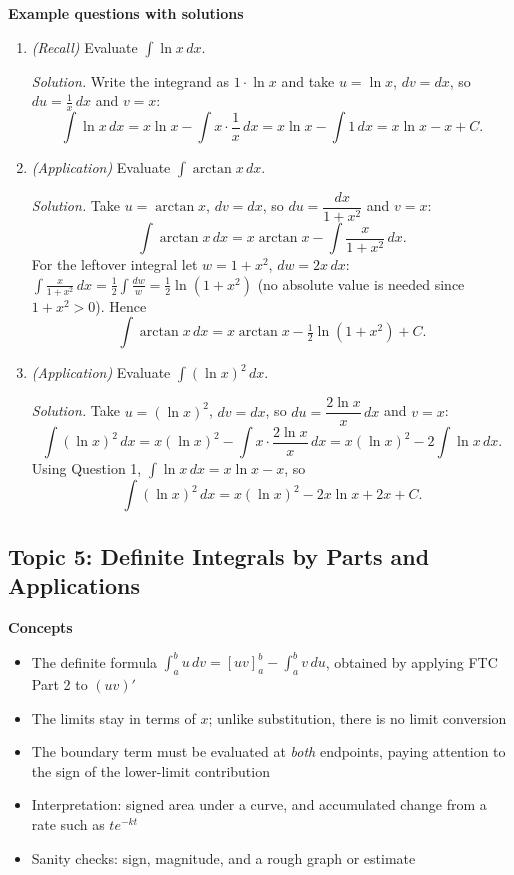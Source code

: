 \documentclass[11pt]{article}
\begin{document}
\textbf{Example questions with solutions}
\begin{enumerate}
\item \emph{(Recall)} Evaluate $\displaystyle\int\ln x\,dx$.

\textit{Solution.} Write the integrand as $1\cdot\ln x$ and take $u=\ln x$, $dv=dx$, so $du=\frac1x\,dx$ and $v=x$:
\[ \int\ln x\,dx = x\ln x - \int x\cdot\frac1x\,dx = x\ln x - \int 1\,dx = x\ln x - x + C. \]

\item \emph{(Application)} Evaluate $\displaystyle\int\arctan x\,dx$.

\textit{Solution.} Take $u=\arctan x$, $dv=dx$, so $du=\dfrac{dx}{1+x^2}$ and $v=x$:
\[ \int\arctan x\,dx = x\arctan x - \int\frac{x}{1+x^2}\,dx. \]
For the leftover integral let $w=1+x^2$, $dw=2x\,dx$: $\int\frac{x}{1+x^2}\,dx=\frac12\int\frac{dw}{w}=\frac12\ln(1+x^2)$ (no absolute value is needed since $1+x^2>0$). Hence
\[ \int\arctan x\,dx = x\arctan x - \tfrac12\ln(1+x^2) + C. \]

\item \emph{(Application)} Evaluate $\displaystyle\int(\ln x)^2\,dx$.

\textit{Solution.} Take $u=(\ln x)^2$, $dv=dx$, so $du=\dfrac{2\ln x}{x}\,dx$ and $v=x$:
\[ \int(\ln x)^2\,dx = x(\ln x)^2 - \int x\cdot\frac{2\ln x}{x}\,dx = x(\ln x)^2 - 2\int\ln x\,dx. \]
Using Question 1, $\int\ln x\,dx = x\ln x - x$, so
\[ \int(\ln x)^2\,dx = x(\ln x)^2 - 2x\ln x + 2x + C. \]
\end{enumerate}

\subsection{Topic 5: Definite Integrals by Parts and Applications}

\textbf{Concepts}
\begin{itemize}
\item The definite formula $\int_a^b u\,dv = [uv]_a^b - \int_a^b v\,du$, obtained by applying FTC Part 2 to $(uv)'$
\item The limits stay in terms of $x$; unlike substitution, there is no limit conversion
\item The boundary term must be evaluated at \emph{both} endpoints, paying attention to the sign of the lower-limit contribution
\item Interpretation: signed area under a curve, and accumulated change from a rate such as $te^{-kt}$
\item Sanity checks: sign, magnitude, and a rough graph or estimate
\end{itemize}
\end{document}
